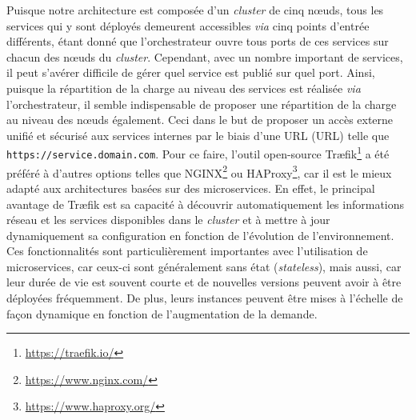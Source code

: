 Puisque notre architecture est composée d'un \textit{cluster} de cinq n\oe{}uds, tous les services qui y sont déployés demeurent accessibles \textit{via} cinq points d'entrée différents, étant donné que l'orchestrateur ouvre tous ports de ces services sur chacun des n\oe{}uds du \textit{cluster}. Cependant, avec un nombre important de services, il peut s'avérer difficile de gérer quel service est publié sur quel port. Ainsi, puisque la répartition de la charge au niveau des services est réalisée \textit{via} l'orchestrateur, il semble indispensable de proposer une répartition de la charge au niveau des n\oe{}uds également. Ceci dans le but de proposer un accès externe unifié et sécurisé aux services internes par le biais d'une \acs{URL} (\acl{URL}) telle que \texttt{https://service.domain.com}. Pour ce faire, l'outil open-source Tr\ae{}fik\footnote{\url{https://traefik.io/}} a été préféré à d'autres options telles que NGINX\footnote{\url{https://www.nginx.com/}} ou HAProxy\footnote{\url{https://www.haproxy.org/}}, car il est le mieux adapté aux architectures basées sur des microservices. En effet, le principal avantage de Tr\ae{}fik est sa capacité à découvrir automatiquement les informations réseau et les services disponibles dans le \textit{cluster} et à mettre à jour dynamiquement sa configuration en fonction de l'évolution de l'environnement. Ces fonctionnalités sont particulièrement importantes avec l'utilisation de  microservices, car ceux-ci sont généralement sans état (\textit{stateless}), mais aussi, car leur durée de vie est souvent courte et de nouvelles versions peuvent avoir à être déployées fréquemment. De plus, leurs instances peuvent être mises à l'échelle de façon dynamique en fonction de l'augmentation de la demande.

